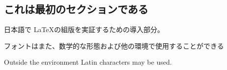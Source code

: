 \documentclass{article}
\begin{document}
 
\begin{CJK}{UTF8}{min}
\section{これは最初のセクションである}
日本語で \LaTeX の組版を実証するための導入部分。
 
フォントはまた、数学的な形態および他の環境で使用することができる
\end{CJK}
 
\vspace{1cm}
 
\noindent
Outside the environment Latin characters may be used.
 
\end{document}

